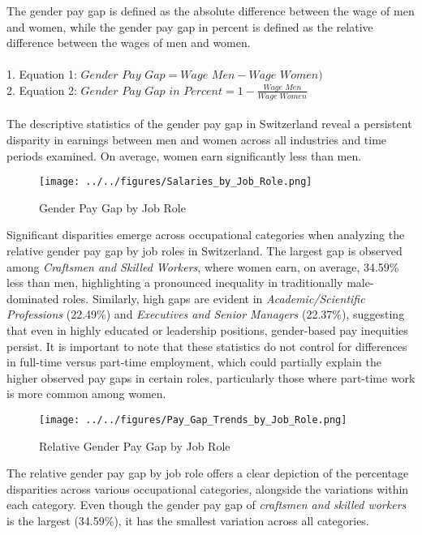 \documentclass{article}
\begin{document}
The gender pay gap is defined as the absolute difference between the wage of men and women, while the gender pay gap in percent is defined as the relative difference between the wages of men and women.\\
\\
  1. Equation 1: \(\textit{Gender Pay Gap} = \textit{Wage Men} - \textit{Wage Women)}\)\\
  2. Equation 2: \(\textit{Gender Pay Gap in Percent} = 1 - \frac{\textit{Wage Men}} 
 {\textit{Wage Women}}\)\\
\\
The descriptive statistics of the gender pay gap in Switzerland reveal a persistent disparity in earnings between men and women across all industries and time periods examined. On average, women earn significantly less than men. \\

\begin{figure}[h]
    \centering
    \texttt{[image: ../../figures/Salaries\_by\_Job\_Role.png]}
    \caption{Gender Pay Gap by Job Role}
    \label{fig:rates_time}
\end{figure}

Significant disparities emerge across occupational categories when analyzing the relative gender pay gap by job roles in Switzerland. The largest gap is observed among \textit{Craftsmen and Skilled Workers}, where women earn, on average, 34.59\% less than men, highlighting a pronounced inequality in traditionally male-dominated roles. Similarly, high gaps are evident in \textit{Academic/Scientific Professions} (22.49\%) and \textit{Executives and Senior Managers} (22.37\%), suggesting that even in highly educated or leadership positions, gender-based pay inequities persist. It is important to note that these statistics do not control for differences in full-time versus part-time employment, which could partially explain the higher observed pay gaps in certain roles, particularly those where part-time work is more common among women.\\


\begin{figure}[h]
    \centering
    \texttt{[image: ../../figures/Pay\_Gap\_Trends\_by\_Job\_Role.png]}
    \caption{Relative Gender Pay Gap by Job Role}
    \label{fig:rates_time}
\end{figure}

The relative gender pay gap by job role offers a clear depiction of the percentage disparities across various occupational categories, alongside the variations within each category. Even though the gender pay gap of \textit{craftsmen and skilled workers} is the largest (34.59\%), it has the smallest variation across all categories.\\
\end{document}
